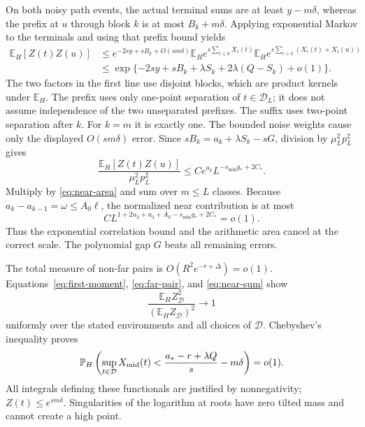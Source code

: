 \documentclass[11pt]{article}
\theoremstyle{definition}\newtheorem{definition}[theorem]{Definition}
\theoremstyle{remark}\newtheorem{remark}[theorem]{Remark}
\newcommand{\E}{\mathbb E}\newcommand{\Pp}{\mathbb P}
\numberwithin{equation}{section}\allowdisplaybreaks
\begin{document}
On both noisy path events, the actual terminal sums are at least
$y-m\delta$, whereas the prefix at $u$ through block $k$ is at most
$B_k+m\delta$. Applying exponential Markov to the terminals and using
that prefix bound yields
\begin{align}\label{eq:near-moment}
 \E_H[Z(t)Z(u)]
 &\le e^{-2sy+sB_k+O(sm\delta)}
    \E_H e^{s\sum_{i\le k}X_i(t)}
    \E_H e^{s\sum_{i>k}(X_i(t)+X_i(u))}\\
 &\le \exp\{-2sy+sB_k+\lambda S_k+2\lambda(Q-S_k)+o(1)\}.
 \nonumber
\end{align}
The two factors in the first line use disjoint blocks, which are product
kernels under $\E_H$. The prefix uses only one-point separation of
$t\in\mathcal D_L$; it does not assume independence of the two
unseparated prefixes. The suffix uses two-point separation after $k$.
For $k=m$ it is exactly one. The bounded noise weights cause only the
displayed $O(sm\delta)$ error.
Since $sB_k=a_k+\lambda S_k-sG$, division by $\mu_L^2p_L^2$ gives
\begin{equation}\label{eq:near-normalized}
 \frac{\E_H[Z(t)Z(u)]}{\mu_L^2p_L^2}
 \le C e^{a_k}L^{-s_{\min}g_*+2C_*}.
\end{equation}
Multiply by \eqref{eq:near-area} and sum over $m\le L$ classes.
Because $a_k-a_{k-1}=\omega\le A_0\ell$, the normalized near contribution
is at most
\begin{equation}\label{eq:near-sum}
 C L^{1+2u_2+u_3+A_0-s_{\min}g_*+2C_*}=o(1).
\end{equation}
Thus the exponential correlation bound and the arithmetic area cancel
at the correct scale. The polynomial gap $G$ beats all remaining errors.

The total measure of non-far pairs is $O(R^2e^{-r+\Delta})=o(1)$.
Equations~\eqref{eq:first-moment}, \eqref{eq:far-pair}, and
\eqref{eq:near-sum} show
\[
 \frac{\E_H Z_{\mathcal D}^2}{(\E_H Z_{\mathcal D})^2}\longrightarrow1
\]
uniformly over the stated environments and all choices of $\mathcal D$.
Chebyshev's inequality proves
\begin{equation}\label{eq:middle-lower}
 \Pp_H\left(\sup_{t\in\mathcal D}X_{\rm mid}(t)
             <\frac{a_*-r+\lambda Q}{s}-m\delta\right)=o(1).
\end{equation}
All integrals defining these functionals are justified by nonnegativity;
$Z(t)\le e^{sm\delta}$. Singularities of the logarithm at roots have zero
tilted mass and cannot create a high point.

\end{document}
